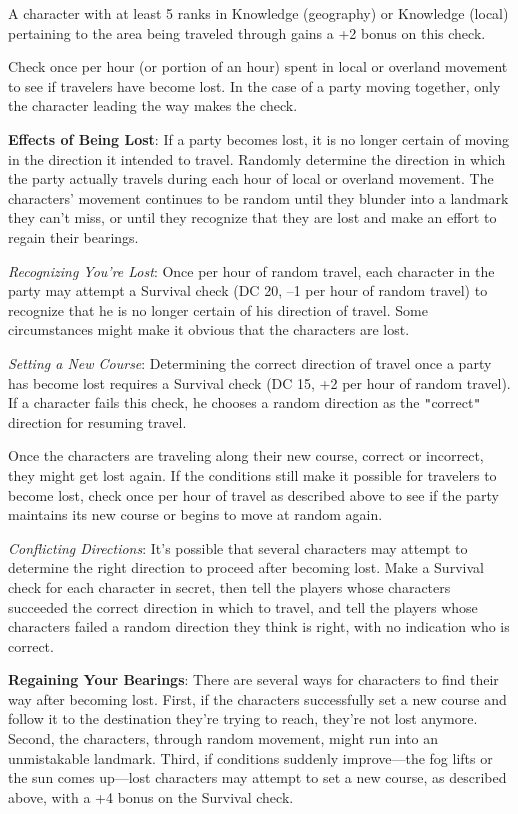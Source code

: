 				
A character with at least 5 ranks in Knowledge (geography) or Knowledge (local) pertaining to the area being traveled through gains a +2 bonus on this check.
				
Check once per hour (or portion of an hour) spent in local or overland movement to see if travelers have become lost. In the case of a party moving together, only the character leading the way makes the check.
				
\textbf{Effects of Being Lost}: If a party becomes lost, it is no longer certain of moving in the direction it intended to travel. Randomly determine the direction in which the party actually travels during each hour of local or overland movement. The characters' movement continues to be random until they blunder into a landmark they can't miss, or until they recognize that they are lost and make an effort to regain their bearings.
				
\textit{Recognizing You're Lost}: Once per hour of random travel, each character in the party may attempt a Survival check (DC 20, --1 per hour of random travel) to recognize that he is no longer certain of his direction of travel. Some circumstances might make it obvious that the characters are lost.
				
\textit{Setting a New Course}: Determining the correct direction of travel once a party has become lost requires a Survival check (DC 15, +2 per hour of random travel). If a character fails this check, he chooses a random direction as the \texttt{{}"{}}correct\texttt{{}"{}} direction for resuming travel.
				
Once the characters are traveling along their new course, correct or incorrect, they might get lost again. If the conditions still make it possible for travelers to become lost, check once per hour of travel as described above to see if the party maintains its new course or begins to move at random again.
				
\textit{Conflicting Directions}: It's possible that several characters may attempt to determine the right direction to proceed after becoming lost. Make a Survival check for each character in secret, then tell the players whose characters succeeded the correct direction in which to travel, and tell the players whose characters failed a random direction they think is right, with no indication who is correct.
				
\textbf{Regaining Your Bearings}: There are several ways for characters to find their way after becoming lost. First, if the characters successfully set a new course and follow it to the destination they're trying to reach, they're not lost anymore. Second, the characters, through random movement, might run into an unmistakable landmark. Third, if conditions suddenly improve---the fog lifts or the sun comes up---lost characters may attempt to set a new course, as described above, with a +4 bonus on the Survival check.
				
